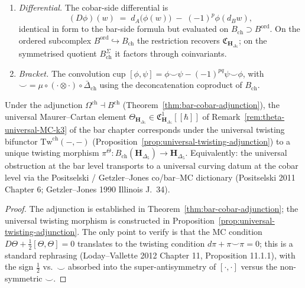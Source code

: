 \begin{definition}
\begin{enumerate}[label=\textup{(\alph*)}]
\item \emph{Differential.} The cobar-side differential is
 \[
 (D\phi)(w) \;=\; d_A\bigl(\phi(w)\bigr)\;-\;(-1)^p \phi(d_B w),
 \]
 identical in form to the bar-side formula but evaluated on
 $B_{\mathrm{ch}} \supset B^{\mathrm{ord}}$. On the ordered subcomplex
 $B^{\mathrm{ord}}\hookrightarrow B_{\mathrm{ch}}$ the restriction
 recovers $\mathfrak{C}_{\mathbf{H}_{\Delta_5}}$; on the symmetrised
 quotient $B_{\mathrm{ch}}^{\Sigma}$ it factors through
 coinvariants.
\item \emph{Bracket.} The convolution cup
 $[\phi,\psi] = \phi\smile\psi - (-1)^{pq}\psi\smile\phi$,
 with $\smile = \mu\circ(\cdot\otimes\cdot)\circ\bar\Delta_{\mathrm{ch}}$
 using the deconcatenation coproduct of $B_{\mathrm{ch}}$.
\end{enumerate}
\end{definition}

\begin{proposition}
\label{prop:bar-cobar-MC-naturality-k3}
Under the adjunction $\Omega^{\mathrm{ch}}\dashv B^{\mathrm{ch}}$
\textup{(}Theorem~\ref{thm:bar-cobar-adjunction}\textup{)}, the
universal Maurer--Cartan element
$\Theta_{\mathbf{H}_{\Delta_5}}\in\mathfrak{C}^1_{\mathbf{H}_{\Delta_5}}[[\hbar]]$
of Remark~\ref{rem:theta-universal-MC-k3}
of the bar chapter corresponds under the universal
twisting bifunctor $\mathrm{Tw}^{\mathrm{ch}}(-,-)$
\textup{(}Proposition~\ref{prop:universal-twisting-adjunction}\textup{)} to
a unique twisting morphism
$\pi^{\Theta}\colon B_{\mathrm{ch}}(\mathbf{H}_{\Delta_5})\to
\mathbf{H}_{\Delta_5}$. Equivalently: the universal obstruction at
the bar level transports to a universal curving datum at the cobar level
via the Positselski / Getzler--Jones co/bar--MC dictionary
\textup{(}Positselski 2011 Chapter 6; Getzler--Jones 1990
\textup{Illinois J.}\ 34\textup{)}.
\end{proposition}

\begin{proof}
The adjunction is established in
Theorem~\ref{thm:bar-cobar-adjunction}; the universal twisting morphism
is constructed in Proposition~\ref{prop:universal-twisting-adjunction}.
The only point to verify is that the MC condition
$D\Theta + \tfrac{1}{2}[\Theta,\Theta]=0$ translates to the twisting
condition $d\pi + \pi\smile\pi = 0$; this is a standard rephrasing
(Loday--Vallette 2012 Chapter 11, Proposition 11.1.1), with the
sign $\tfrac{1}{2}$ vs.\ $\smile$ absorbed into the super-antisymmetry
of $[\cdot,\cdot]$ versus the non-symmetric $\smile$.
\end{proof}

